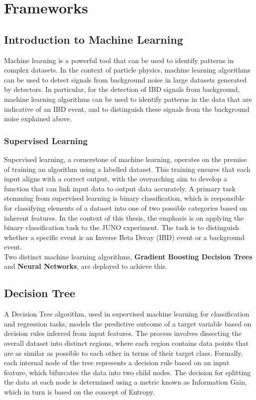 \chapter{Frameworks}
\section{Introduction to Machine Learning}

Machine learning is a powerful tool that can be used to identify patterns in complex datasets. In the context of particle physics, machine learning algorithms can be used to detect signals from background noise in large datasets generated by detectors. In particular, for the detection of IBD signals from background, machine learning algorithms can be used to identify patterns in the data that are indicative of an IBD event, and to distinguish these signals from the background noise explained above.

\subsection{Supervised Learning}
Supervised learning, a cornerstone of machine learning, operates on the premise of training an algorithm using a labelled dataset. This training ensures that each input aligns with a correct output, with the overarching aim to develop a function that can link input data to output data accurately. A primary task stemming from supervised learning is binary classification, which is responsible for classifying elements of a dataset into one of two possible categories based on inherent features. In the context of this thesis, the emphasis is on applying the binary classification task to the JUNO experiment. The task is to distinguish whether a specific event is an Inverse Beta Decay (IBD) event or a background event.\\
 
Two distinct machine learning algorithms, \textbf{Gradient Boosting Decision Trees} and \textbf{Neural Networks}, are deployed to achieve this.

\section{Decision Tree}
A Decision Tree algorithm, used in supervised machine learning for classification and regression tasks, models the predictive outcome of a target variable based on decision rules inferred from input features. The process involves dissecting the overall dataset into distinct regions, where each region contains data points that are as similar as possible to each other in terms of their target class. Formally, each internal node of the tree represents a decision rule based on an input feature, which bifurcates the data into two child nodes. The decision for splitting the data at each node is determined using a metric known as Information Gain, which in turn is based on the concept of Entropy.

